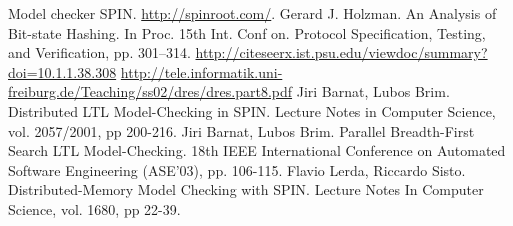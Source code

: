 \begin{thebibliography}{99}


 Model checker SPIN. \url{http://spinroot.com/}.
 Gerard J. Holzman. An Analysis of Bit-state
  Hashing. In Proc. 15th Int. Conf on. Protocol Specification,
  Testing, and Verification, pp. 301–314.
  \url{http://citeseerx.ist.psu.edu/viewdoc/summary?doi=10.1.1.38.308}
  \url{http://tele.informatik.uni-freiburg.de/Teaching/ss02/dres/dres.part8.pdf}
 Jiri Barnat, Lubos Brim. Distributed LTL
  Model-Checking in SPIN. Lecture Notes in Computer Science,
  vol. 2057/2001, pp 200-216.
 Jiri Barnat, Lubos Brim. Parallel Breadth-First Search
  LTL Model-Checking. 18th IEEE International Conference on Automated
  Software Engineering (ASE'03), pp. 106-115.
 Flavio Lerda, Riccardo Sisto. Distributed-Memory Model
  Checking with SPIN. Lecture Notes In Computer Science, vol. 1680, pp
  22-39.
\end{thebibliography}

